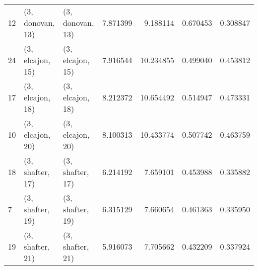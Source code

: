 \begin{tabular}{lllrrrr}
12 &  (3, donovan, 13) &  (3, donovan, 13) &  7.871399 &   9.188114 &   0.670453 &  0.308847 \\
24 &  (3, elcajon, 15) &  (3, elcajon, 15) &  7.916544 &  10.234855 &   0.499040 &  0.453812 \\
17 &  (3, elcajon, 18) &  (3, elcajon, 18) &  8.212372 &  10.654492 &   0.514947 &  0.473331 \\
10 &  (3, elcajon, 20) &  (3, elcajon, 20) &  8.100313 &  10.433774 &   0.507742 &  0.463759 \\
18 &  (3, shafter, 17) &  (3, shafter, 17) &  6.214192 &   7.659101 &   0.453988 &  0.335882 \\
7  &  (3, shafter, 19) &  (3, shafter, 19) &  6.315129 &   7.660654 &   0.461363 &  0.335950 \\
19 &  (3, shafter, 21) &  (3, shafter, 21) &  5.916073 &   7.705662 &   0.432209 &  0.337924 \\
\bottomrule
\end{tabular}

